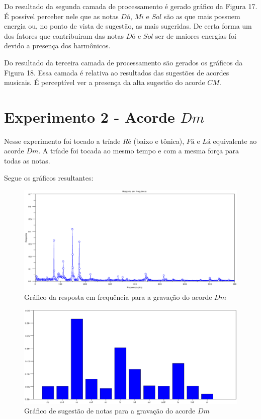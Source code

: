 Do resultado da segunda camada de processamento é gerado gráfico da Figura 17. É possível perceber nele que as notas $Dó$, $Mi$ e $Sol$ são as que mais possuem energia ou, no ponto de vista de sugestão, as mais sugeridas. De certa forma um dos fatores que contribuiram das notas $Dó$ e $Sol$ ser de maiores energias foi devido a presença dos harmônicos.

Do resultado da terceira camada de processamento são gerados os gráficos da Figura 18. Essa camada é relativa ao resultados das sugestões de acordes musicais. É perceptível ver a presença da alta sugestão do acorde $CM$.
\section{Experimento 2 - Acorde $Dm$}
\label{sec:experimento2}

Nesse experimento foi tocado a tríade $Ré$ (baixo e tônica), $Fá$ e $Lá$ equivalente ao acorde $Dm$. A tríade foi tocada ao mesmo tempo e com a mesma força para todas as notas.

Segue os gráficos resultantes:

\begin{figure}[h]
	\centering
		\includegraphics[keepaspectratio=true,scale=0.49]{figuras/Dm/fft_Dm.eps}
	\caption{Gráfico da resposta em frequência para a gravação do acorde $Dm$}
\end{figure}

\begin{figure}[h]
	\centering
		\includegraphics[keepaspectratio=true,scale=0.49]{figuras/Dm/notas_Dm.eps}
	\caption{Gráfico de sugestão de notas para a gravação do acorde $Dm$}
\end{figure}

